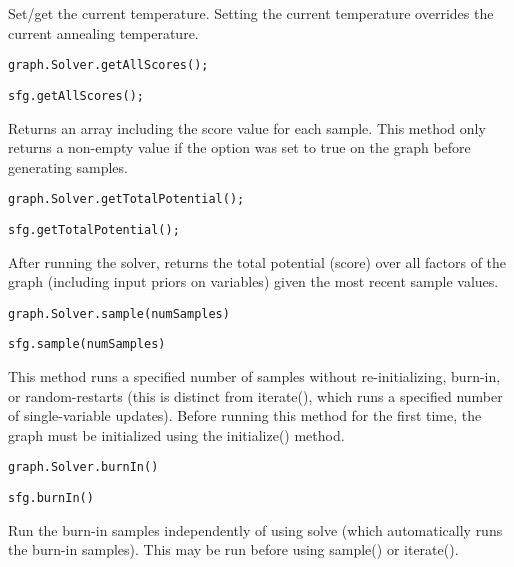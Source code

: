 Set/get the current temperature. Setting the current temperature overrides the current annealing temperature.

\ifmatlab
\begin{lstlisting}
graph.Solver.getAllScores();
\end{lstlisting}
\fi

\ifjava
\begin{lstlisting}
sfg.getAllScores();
\end{lstlisting}
\fi

Returns an array including the score value for each sample. This method only returns a non-empty value if the  option was set to true on the graph before generating samples.

\ifmatlab
\begin{lstlisting}
graph.Solver.getTotalPotential();
\end{lstlisting}
\fi

\ifjava
\begin{lstlisting}
sfg.getTotalPotential();
\end{lstlisting}
\fi

After running the solver, returns the total potential (score) over all factors of the graph (including input priors on variables) given the most recent sample values.

\ifmatlab
\begin{lstlisting}
graph.Solver.sample(numSamples)
\end{lstlisting}
\fi

\ifjava
\begin{lstlisting}
sfg.sample(numSamples)
\end{lstlisting}
\fi

This method runs a specified number of samples without re-initializing, burn-in, or random-restarts (this is distinct from iterate(), which runs a specified number of single-variable updates).  Before running this method for the first time, the graph must be initialized using the initialize() method.

\ifmatlab
\begin{lstlisting}
graph.Solver.burnIn()
\end{lstlisting}
\fi

\ifjava
\begin{lstlisting}
sfg.burnIn()
\end{lstlisting}
\fi

Run the burn-in samples independently of using solve (which automatically runs the burn-in samples).  This may be run before using sample() or iterate().


